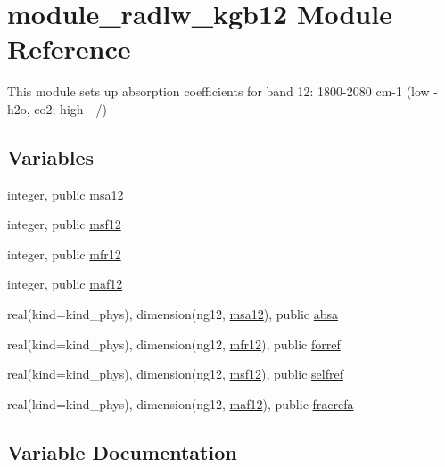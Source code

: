 \hypertarget{namespacemodule__radlw__kgb12}{}\section{module\+\_\+radlw\+\_\+kgb12 Module Reference}
\label{namespacemodule__radlw__kgb12}


This module sets up absorption coefficients for band 12\+: 1800-\/2080 cm-\/1 (low -\/ h2o, co2; high -\/ /)  


\subsection*{Variables}
\begin{DoxyCompactItemize}
\item 
integer, public \hyperlink{namespacemodule__radlw__kgb12_ad1ddd94fe11b11485502d1fe6f5a1615}{msa12}
\item 
integer, public \hyperlink{namespacemodule__radlw__kgb12_a3282a15ee0faaafd65509536a59e5b4f}{msf12}
\item 
integer, public \hyperlink{namespacemodule__radlw__kgb12_acd751a2e48d0286e3d25a9b658a8367a}{mfr12}
\item 
integer, public \hyperlink{namespacemodule__radlw__kgb12_a9d7c05182e21605108bd65f47bb5569c}{maf12}
\item 
real(kind=kind\+\_\+phys), dimension(ng12, \hyperlink{namespacemodule__radlw__kgb12_ad1ddd94fe11b11485502d1fe6f5a1615}{msa12}), public \hyperlink{namespacemodule__radlw__kgb12_a7600bfa19dde3b47d8479f5766ee0c93}{absa}
\item 
real(kind=kind\+\_\+phys), dimension(ng12, \hyperlink{namespacemodule__radlw__kgb12_acd751a2e48d0286e3d25a9b658a8367a}{mfr12}), public \hyperlink{namespacemodule__radlw__kgb12_a97dac0d0e010441171e09e317e5aeee8}{forref}
\item 
real(kind=kind\+\_\+phys), dimension(ng12, \hyperlink{namespacemodule__radlw__kgb12_a3282a15ee0faaafd65509536a59e5b4f}{msf12}), public \hyperlink{namespacemodule__radlw__kgb12_a8aaf83ec7a08a244fd1e5396c9fd9b1d}{selfref}
\item 
real(kind=kind\+\_\+phys), dimension(ng12, \hyperlink{namespacemodule__radlw__kgb12_a9d7c05182e21605108bd65f47bb5569c}{maf12}), public \hyperlink{namespacemodule__radlw__kgb12_a58ff4f54c11eb12f7ab5157823981b16}{fracrefa}
\end{DoxyCompactItemize}


\subsection{Variable Documentation}
